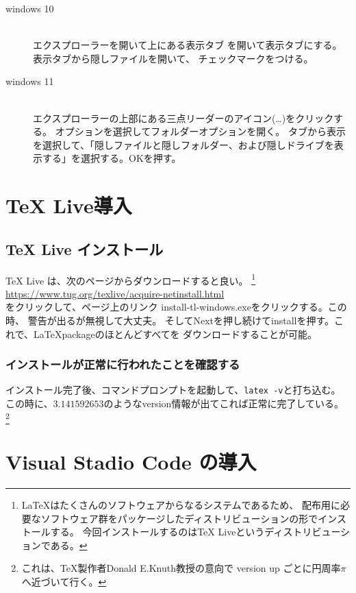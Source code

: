 \documentclass[titlepage]{ltjsarticle}
\begin{document}
\begin{description}
  \item[windows 10] ~\\ 
    エクスプローラーを開いて上にある表示タブ
    を開いて表示タブにする。表示タブから隠しファイルを開いて、
    チェックマークをつける。
  \item[windows 11] ~\\
    エクスプローラーの上部にある三点リーダーのアイコン(…)をクリックする。
    オプションを選択してフォルダーオプションを開く。
    タブから表示を選択して、「隠しファイルと隠しフォルダー、および隠しドライブを表示する」を選択する。OKを押す。
\end{description}
\section{TeX Live導入}

\subsection{TeX Live インストール}
TeX Live は、次のページからダウンロードすると良い。
\footnote{
  \LaTeX はたくさんのソフトウェアからなるシステムであるため、
  配布用に必要なソフトウェア群をパッケージしたディストリビューションの形でインストールする。
  今回インストールするのはTeX Liveというディストリビューションである。
}
\\
\url{https://www.tug.org/texlive/acquire-netinstall.html}\\
をクリックして、ページ上のリンク install-tl-windows.exeをクリックする。この時、
警告が出るが無視して大丈夫。
そしてNextを押し続けてinstallを押す。これで、\LaTeX packageのほとんどすべてを
ダウンロードすることが可能。

\subsubsection*{インストールが正常に行われたことを確認する}
インストール完了後、コマンドプロンプトを起動して、\verb|latex -v|と打ち込む。
この時に、$3.141592653$のようなversion情報が出てこれば正常に完了している。
\footnote{
  これは、\TeX 製作者Donald E.Knuth教授の意向で
  version up ごとに円周率$\pi$へ近づいて行く。
}

\section{Visual Stadio Code の導入}
\end{document}
